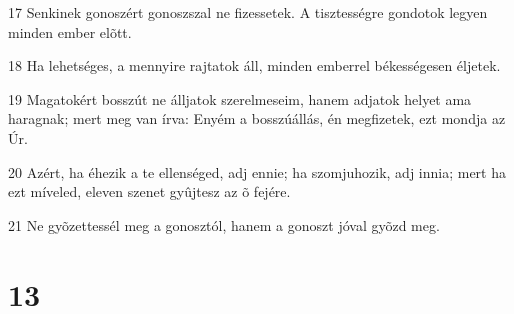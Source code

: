 \par 17 Senkinek gonoszért gonoszszal ne fizessetek. A tisztességre gondotok legyen minden ember  elõtt.
\par 18 Ha lehetséges, a mennyire rajtatok áll, minden emberrel békességesen éljetek.
\par 19 Magatokért bosszút ne álljatok szerelmeseim, hanem adjatok helyet ama haragnak; mert meg van írva: Enyém a bosszúállás, én  megfizetek, ezt mondja az Úr.
\par 20 Azért, ha éhezik a te ellenséged, adj ennie; ha szomjuhozik, adj innia; mert ha ezt míveled, eleven szenet gyûjtesz az õ fejére.
\par 21 Ne gyõzettessél meg a gonosztól, hanem a gonoszt jóval gyõzd meg.

\chapter{13}

